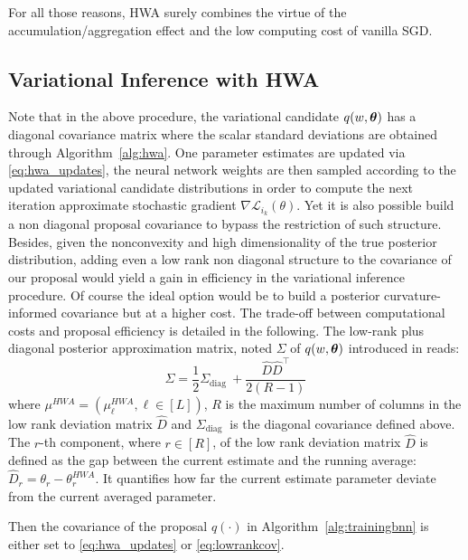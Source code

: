 \documentclass{article} %
\begin{document}
For all those reasons, \textsc{HWA} surely combines the virtue of the accumulation/aggregation effect and the low computing cost of vanilla SGD.



\subsection{Variational Inference with HWA}
Note that in the above procedure, the variational candidate $q(w, \param)$ has a diagonal covariance matrix where the scalar standard deviations are obtained through Algorithm~\ref{alg:hwa}.
One parameter estimates are updated via \eqref{eq:hwa_updates}, the neural network weights are then sampled according to the updated variational candidate distributions in order to compute the next iteration approximate stochastic gradient $\nabla \mathcal{L}_{i_{k}}(\theta)$.
Yet it is also possible build a non diagonal proposal covariance to bypass the restriction of such structure.
Besides, given the nonconvexity and high dimensionality of the true posterior distribution, adding even a low rank non diagonal structure to the covariance of our proposal would yield a gain in efficiency in the variational inference procedure.
Of course the ideal option would be to build a posterior curvature-informed covariance but at a higher cost.
The trade-off between computational costs and proposal efficiency is detailed in the following.
The low-rank plus diagonal posterior approximation matrix, noted $\Sigma$ of $q(w, \param)$ introduced in \citep{maddox2019simple} reads:
\begin{equation}\label{eq:lowrankcov}
\Sigma = \frac{1}{2} \Sigma_{\text {diag }}+\frac{\widehat{D} \widehat{D}^{\top}}{2(R-1)}
\end{equation}
where $\mu^{HWA} = (\mu_{\ell}^{HWA}, \ell \in [L])$, $R$ is the maximum number of columns in the low rank deviation matrix $\widehat{D}$ and $\Sigma_{\text {diag }}$ is the diagonal covariance defined above. The $r$-th component, where $r \in [R]$, of the  low rank deviation matrix $\widehat{D}$ is defined as the gap between the current estimate and the running average: $\widehat{D}_r = \theta_r - \theta^{HWA}_r$. It quantifies how far the current estimate parameter deviate from the current averaged parameter.

Then the covariance of the proposal $q(\cdot)$ in Algorithm~\ref{alg:trainingbnn} is either set to \eqref{eq:hwa_updates} or \eqref{eq:lowrankcov}.
\end{document}
